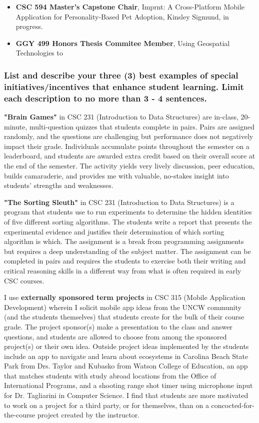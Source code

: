 \documentclass[10pt]{article}
\newcommand\D{\hangindent1.25cm}
\begin{document}
\begin{itemize}
    \item \textbf{CSC 594 Master's Capstone Chair}, Imprnt: A Cross-Platform Mobile Application for Personality-Based Pet Adoption, Kinsley Sigmund, in progress.
    \item \textbf{GGY 499 Honors Thesis Commitee Member}, Using Geospatial Technologies to 
\end{itemize}

\subsubsection{List and describe your three (3) best examples of special initiatives/incentives that enhance student learning. Limit each description to no more than 3 - 4 sentences.}

\renewcommand\D{
    \hangindent\innerparindent
    \setlength{\parskip}{1em}
    \setlength{\parindent}{\innerparindent}
    }
    
\D \textbf{"Brain Games"} in CSC 231 (Introduction to Data Structures) are in-class, 20-minute, multi-question quizzes that students complete in pairs. Pairs are assigned randomly, and the questions are challenging but performance does not negatively impact their grade. Individuals accumulate points throughout the semester on a leaderboard, and students are awarded extra credit based on their overall score at the end of the semester. The activity yields very lively discussion, peer education, builds camaraderie, and provides me with valuable, no-stakes insight into students' strengths and weaknesses. 

\D \textbf{"The Sorting Sleuth"} in CSC 231 (Introduction to Data Structures) is a program that students use to run experiments to determine the hidden identities of five different sorting algorithms. The students write a report that presents the experimental evidence and justifies their determination of which sorting algorithm is which. The assignment is a break from programming assignments but requires a deep understanding of the subject matter. The assignment can be completed in pairs and requires the students to exercise both their writing and critical reasoning skills in a different way from what is often required in early CSC courses.

\D I use \textbf{externally sponsored term projects} in CSC 315 (Mobile Application Development) wherein I solicit mobile app ideas from the UNCW community (and the students themselves) that students create for the bulk of their course grade. The project sponsor(s) make a presentation to the class and answer questions, and students are allowed to choose from among the sponsored project(s) or their own idea. Outside project ideas implemented by the students include an app to navigate and learn about ecosystems in Carolina Beach State Park from Drs. Taylor and Kubasko from Watson College of Education, an app that matches students with study abroad locations from the Office of International Programs, and a shooting range shot timer using microphone input for Dr. Tagliarini in Computer Science. I find that students are more motivated to work on a project for a third party, or for themselves, than on a concocted-for-the-course project created by the instructor.
\end{document}
